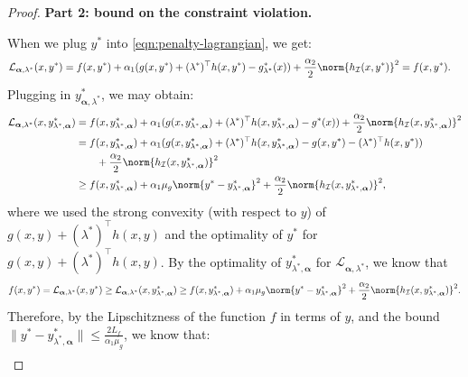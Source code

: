 \begin{proof}
\noindent\textbf{Part 2: bound on the constraint violation.}

When we plug $y^*$ into \cref{eqn:penalty-lagrangian}, we get:
\begin{align*}
    \mathcal{L}_{\boldsymbol{\alpha}, \lambda^*}(x,y^*) & = f(x,y^*) + \alpha_1 (g(x,y^*) + (\lambda^*)^\top h(x,y^*) - g^*_{\lambda^*}(x)) + \frac{\alpha_2}{2} \norm{h_\mathcal{I}(x,y^*)}^2 = f(x,y^*).
\end{align*}
Plugging in $y^*_{\boldsymbol{\alpha},\lambda^*}$, we may obtain: 
\begin{align*}
    \mathcal{L}_{\boldsymbol{\alpha}, \lambda^*}(x,y_{\lambda^*,\boldsymbol{\alpha}}^*) & = f(x,y_{\lambda^*,\boldsymbol{\alpha}}^*) + \alpha_1 (g(x,y_{\lambda^*,\boldsymbol{\alpha}}^*) + (\lambda^*)^\top h(x,y_{\lambda^*,\boldsymbol{\alpha}}^*) - g^*(x)) + \frac{\alpha_2}{2} \norm{h_\mathcal{I}(x,y_{\lambda^*,\boldsymbol{\alpha}}^*)}^2 \\
    & = f(x,y_{\lambda^*,\boldsymbol{\alpha}}^*) + \alpha_1 (  g(x,y_{\lambda^*,\boldsymbol{\alpha}}^*) + (\lambda^*)^\top h(x,y_{\lambda^*,\boldsymbol{\alpha}}^*) - g(x,y^*) - (\lambda^*)^\top h(x,y^*) ) \\
    & \qquad + \frac{\alpha_2}{2} \norm{h_\mathcal{I}(x,y_{\lambda^*,\boldsymbol{\alpha}}^*)}^2 \\
    & \geq f(x,y_{\lambda^*,\boldsymbol{\alpha}}^*) + \alpha_1 \mu_g \norm{y^* - y_{\lambda^*,\boldsymbol{\alpha}}^*}^2 + \frac{\alpha_2}{2} \norm{h_\mathcal{I}(x,y_{\lambda^*,\boldsymbol{\alpha}}^*)}^2,
\end{align*} where we used the strong convexity (with respect to $y$) of $g(x,y)+(\lambda^*)^\top h(x,y)$ and the optimality of $y^*$ for $g(x,y)+(\lambda^*)^\top h(x,y)$. 
By the optimality of $y_{\lambda^*,\boldsymbol{\alpha}}^*$ for $\mathcal{L}_{\boldsymbol{\alpha}, \lambda^*}$, we know that 
\begin{align*}
    f(x,y^*) = \mathcal{L}_{\boldsymbol{\alpha}, \lambda^*}(x,y^*) \geq \mathcal{L}_{\boldsymbol{\alpha}, \lambda^*}(x,y_{\lambda^*,\boldsymbol{\alpha}}^*) \geq f(x,y_{\lambda^*,\boldsymbol{\alpha}}^*) + \alpha_1 \mu_g \norm{y^* - y_{\lambda^*,\boldsymbol{\alpha}}^*}^2 + \frac{\alpha_2}{2} \norm{h_\mathcal{I}(x,y_{\lambda^*,\boldsymbol{\alpha}}^*)}^2.
\end{align*}
Therefore, by the Lipschitzness of the function $f$ in terms of $y$, and the bound $\|y^* - y_{\lambda^*,\boldsymbol{\alpha}}^*\| \leq \frac{2L_f}{\alpha_1 \mu_g}$, we know that:\begin{align*}

\end{align*}
\end{proof}
